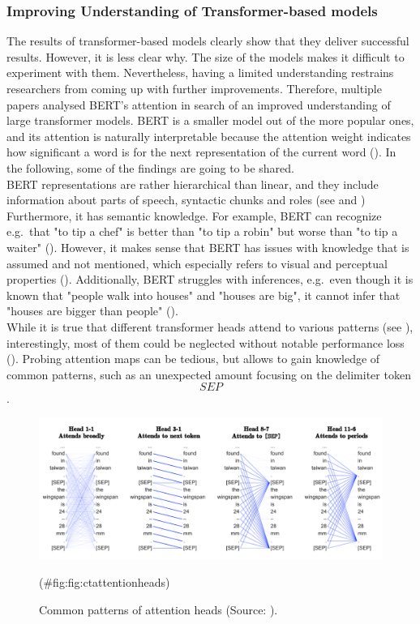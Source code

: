 \documentclass[
]{krantz}
\begin{document}
\hypertarget{improving-understanding-of-transformer-based-models}{%
\subsubsection{Improving Understanding of Transformer-based models}\label{improving-understanding-of-transformer-based-models}}

The results of transformer-based models clearly show that they deliver
successful results. However, it is less clear why. The size of the
models makes it difficult to experiment with them. Nevertheless, having
a limited understanding restrains researchers from coming up with
further improvements. Therefore, multiple papers analysed BERT's
attention in search of an improved understanding of large transformer
models. BERT is a smaller model out of the more popular ones, and its
attention is naturally interpretable because the attention weight
indicates how significant a word is for the next representation of the
current word (\citep{Clark2019}). In the following, some of the findings are
going to be shared.\\
BERT representations are rather hierarchical than linear, and they
include information about parts of speech, syntactic chunks and roles
(see \citep{Lin2019} and \citep{Liu2019}) Furthermore, it has semantic knowledge.
For example, BERT can recognize e.g.~that "to tip a chef" is better
than "to tip a robin" but worse than "to tip a waiter"
(\citep{Ettinger2019}). However, it makes sense that BERT has issues with
knowledge that is assumed and not mentioned, which especially refers to
visual and perceptual properties (\citep{Da2019}). Additionally, BERT
struggles with inferences, e.g.~even though it is known that "people
walk into houses" and "houses are big", it cannot infer that "houses
are bigger than people" (\citep{Forbes2019}).\\
While it is true that different transformer heads attend to various
patterns (see ), interestingly, most of them could be neglected without
notable performance loss (\citep{Voita2019}). Probing attention maps can be
tedious, but allows to gain knowledge of common patterns, such as an
unexpected amount focusing on the delimiter token \[SEP\].

\begin{figure}

{\centering \includegraphics[width=0.9\linewidth]{./figures/01-01-nlp/ct_attention-heads} 

}

\caption{Common patterns of attention heads (Source: \citet{Clark2019}).}(\#fig:fig:ctattentionheads)
\end{figure}
\end{document}
